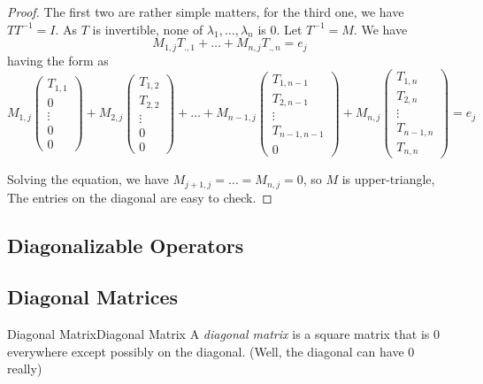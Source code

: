 \documentclass[../main.tex]{subfiles}
\begin{document}
\begin{proof}
The first two are rather simple matters, for the third one, we have  $T T^{-1}=I$. As $T$ is invertible, none of $\lambda_1, \ldots ,\lambda_n$ is $0$. Let $T^{-1}=M$. We have
\begin{equation*}
M_{1,j}T_{.,1} + \ldots + M_{n,j}T_{.,n} = e_j
\end{equation*}
having the form as
\begin{equation*}
M_{1,j}
\begin{pmatrix}
T_{1,1}\\0\\ \vdots \\0\\0
\end{pmatrix}
+ M_{2,j}
\begin{pmatrix}
T_{1,2}\\T_{2,2}\\ \vdots \\0\\0
\end{pmatrix}
+ \ldots +
M_{n-1,j}
\begin{pmatrix}
T_{1,n-1}\\T_{2,n-1}\\ \vdots \\T_{n-1,n-1}\\0
\end{pmatrix}
+ M_{n,j}
\begin{pmatrix}
T_{1,n}\\T_{2,n}\\ \vdots \\T_{n-1,n}\\T_{n,n}
\end{pmatrix}
=e_j
\end{equation*}

Solving the equation, we have $M_{j+1,j} = \ldots =M_{n,j} = 0$, so $M$ is upper-triangle, The entries on the diagonal are easy to check.
\end{proof}

\subsection{Diagonalizable Operators}
\subsection{Diagonal Matrices}
\begin{definition}{Diagonal Matrix}{Diagonal Matrix}
A \emph{diagonal matrix} is a square matrix that is $0$ everywhere except possibly on the diagonal. (Well, the diagonal can have $0$ really)
\end{definition}
\end{document}
